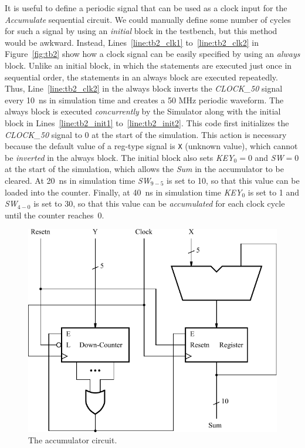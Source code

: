 \documentclass[11pt, twoside, pdftex]{article}
\begin{document}
\noindent
It is useful to define a periodic signal that can be used as a clock input for 
the {\it Accumulate} sequential circuit. We could manually define some number of cycles 
for such a signal by using an {\it initial} block in the testbench, but this method would be
awkward. Instead, Lines~\ref{line:tb2_clk1} to~\ref{line:tb2_clk2} in 
Figure~\ref{fig:tb2} show how a clock signal can be 
easily specified by using an {\it always} block. Unlike an initial block, in which the
statements are executed just once in sequential order, the statements in an always block
are executed repeatedly. Thus, Line~\ref{line:tb2_clk2} in the always block inverts the 
{\it CLOCK\_50} signal 
every 10~ns in simulation time and creates a 50 MHz periodic waveform. The always block is
executed {\it concurrently} by the Simulator along with the initial block in
Lines~\ref{line:tb2_init1} to~\ref{line:tb2_init2}. This code first initializes the {\it CLOCK\_50} 
signal to 0 at the start of the simulation. This action is necessary because the default 
value of a reg-type signal is \texttt{X} (unknown value), which cannot be {\it inverted} 
in the always block. The initial block also sets {\it KEY}$_0 = 0$ and {\it SW}$=0$
at the start of the simulation, which allows the {\it Sum} in the accumulator to be
cleared. At 20~ns in simulation time {\it SW}$_{9-5}$ is set to 10, so that this value can 
be loaded into the counter. Finally, at 40~ns in simulation time {\it KEY}$_0$
is set to 1 and {\it SW}$_{4-0}$ is set to 30, so that this value can be
{\it accumulated} for each clock cycle until the counter reaches~0.

\begin{figure}[t]
	\begin{center}
		\includegraphics[scale = 1.0]{figures/figaccum.pdf}
	\end{center}
		  \caption{The accumulator circuit.}
	\label{fig:circuit}
\end{figure}
\end{document}
